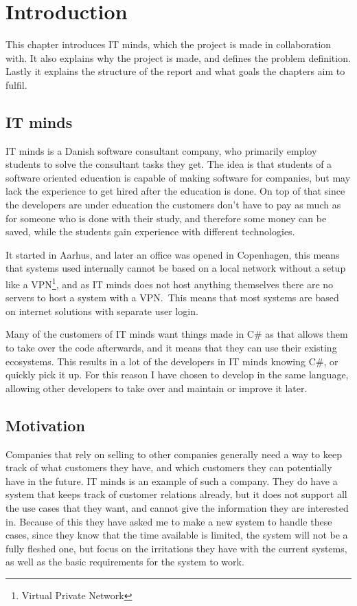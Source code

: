 \chapter{Introduction}
\label{chap:Introduction}
This chapter introduces IT minds, which the project is made in collaboration
with. It also explains why the project is made, and defines the problem
definition. Lastly it explains the structure of the report and what goals the
chapters aim to fulfil. 

\section{IT minds}
\label{sec:IT minds}
IT minds is a Danish software consultant company\cite{IT-minds}, who primarily
employ students to solve the consultant tasks they get. The idea is that
students of a software oriented education is capable of making software for
companies, but may lack the experience to get hired after the education is done.
On top of that since the developers are under education the customers don't have
to pay as much as for someone who is done with their study, and therefore some
money can be saved, while the students gain experience with different technologies. 

It started in Aarhus, and later an office was opened in Copenhagen, this means
that systems used internally cannot be based on a local network without a setup
like a VPN\footnote{Virtual Private Network}, and as IT minds does not host
anything themselves there are no servers to host a system with a VPN.\ This means
that most systems are based on internet solutions with separate user login. 

Many of the customers of IT minds want things made in C\# as that allows them
to take over the code afterwards, and it means that they can use their existing
ecosystems. This results in a lot of the developers in IT minds knowing C\#,
or quickly pick it up. For this reason I have chosen to develop in the same
language, allowing other developers to take over and maintain or improve it later. 

\section{Motivation}
\label{sec:Motivation}
Companies that rely on selling to other companies generally need a way to keep
track of what customers they have, and which customers they can potentially have
in the future. IT minds is an example of such a company. They do have a system
that keeps track of customer relations already, but it does not support all the
use cases that they want, and cannot give the information they are interested
in. Because of this they have asked me to make a new system to handle these
cases, since they know that the time available is limited, the system will
not be a fully fleshed one, but focus on the irritations they have with the
current systems, as well as the basic requirements for the system to work. 

